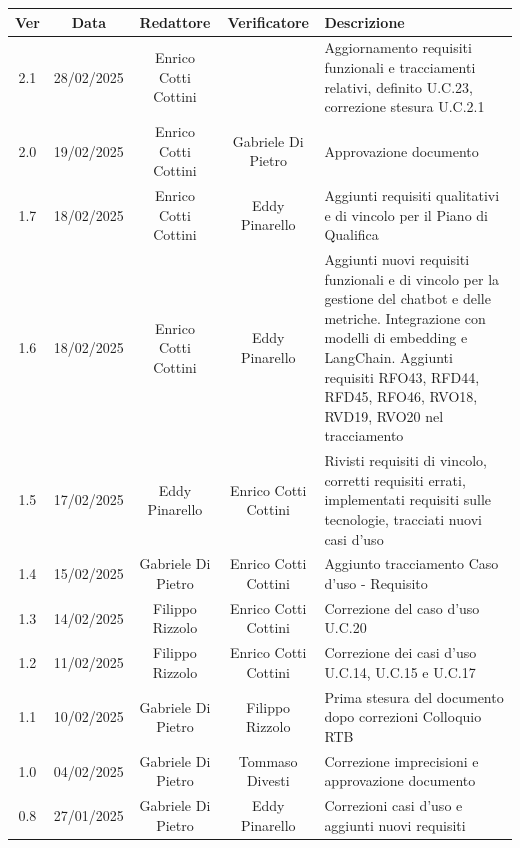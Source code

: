 \documentclass{article}
\begin{document}
\newpage
\begin{table}[h]
    \centering
    \renewcommand{\arraystretch}{1.2}
    \setlength{\tabcolsep}{5pt}
    \begin{tabular}{|c|c|c|c|m{}|}
        \hline
        \textbf{Ver} & \textbf{Data} & \textbf{Redattore} & \textbf{Verificatore} & \textbf{Descrizione} \\
        \hline
        2.1 & 28/02/2025 & Enrico Cotti Cottini &  &  Aggiornamento requisiti funzionali e tracciamenti relativi, definito U.C.23, correzione stesura U.C.2.1 \\
        \hline
        2.0 & 19/02/2025 & Enrico Cotti Cottini & Gabriele Di Pietro & Approvazione documento  \\
        \hline
        1.7 & 18/02/2025 & Enrico Cotti Cottini & Eddy Pinarello & Aggiunti requisiti qualitativi e di vincolo per il Piano di Qualifica \\
        \hline
        1.6 & 18/02/2025 & Enrico Cotti Cottini & Eddy Pinarello & Aggiunti nuovi requisiti funzionali e di vincolo per la gestione del chatbot e delle metriche. Integrazione con modelli di embedding e LangChain. Aggiunti requisiti RFO43, RFD44, RFD45, RFO46, RVO18, RVD19, RVO20 nel tracciamento \\
        \hline
        1.5 & 17/02/2025 & Eddy Pinarello & Enrico Cotti Cottini & Rivisti requisiti di vincolo, corretti requisiti errati, implementati requisiti sulle tecnologie, tracciati nuovi casi d'uso \\
        \hline
        1.4 & 15/02/2025 & Gabriele Di Pietro & Enrico Cotti Cottini & Aggiunto tracciamento Caso d'uso - Requisito \\
        \hline
        1.3 & 14/02/2025 & Filippo Rizzolo & Enrico Cotti Cottini & Correzione del caso d'uso U.C.20 \\
        \hline
        1.2 & 11/02/2025 & Filippo Rizzolo & Enrico Cotti Cottini & Correzione dei casi d'uso U.C.14, U.C.15 e U.C.17 \\
        \hline
        1.1 & 10/02/2025 & Gabriele Di Pietro & Filippo Rizzolo & Prima stesura del documento dopo correzioni Colloquio RTB \\
        \hline
        1.0 & 04/02/2025 & Gabriele Di Pietro & Tommaso Divesti & Correzione imprecisioni e approvazione documento \\
        \hline
        0.8 & 27/01/2025 & Gabriele Di Pietro & Eddy Pinarello & Correzioni casi d'uso e aggiunti nuovi requisiti \\

\end{tabular}
\end{table}
\end{document}
